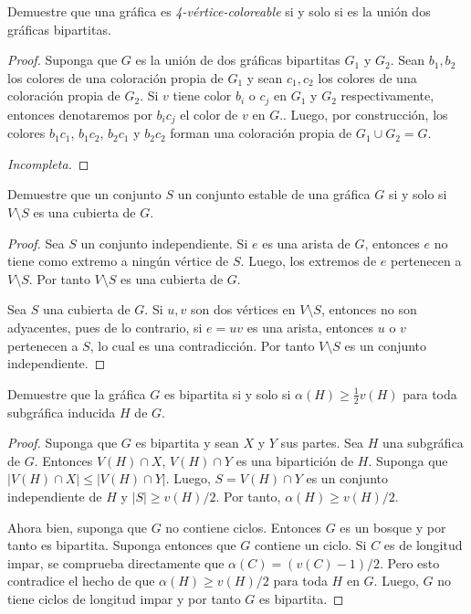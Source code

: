 \documentclass[12pt]{article}
\newenvironment{problem}[2][Problema]{\begin{trivlist}
\item[\hskip \labelsep {\bfseries #1}\hskip \labelsep {\bfseries #2.}]}{\end{trivlist}}
\begin{document}
\begin{problem}{11.2.4} Demuestre que una gráfica es \textit{4-vértice-coloreable} si y solo si es la unión dos gráficas bipartitas.
\end{problem}
\begin{proof}
Suponga que $G$ es la unión de dos gráficas bipartitas $G_1$ y $G_2.$ Sean $b_1, b_2$ los colores de una coloración propia de $G_1$ y sean $c_1, c_2$ los colores de una coloración propia de $G_2.$  Si $v$ tiene color $b_i$ o $c_j$ en $G_1$ y $G_2$ respectivamente, entonces denotaremos por $b_i c_j$ el color de $v$ en $G.$. Luego, por construcción, los colores $b_1 c_1$, $b_1 c_2$, $b_2 c_1$ y $b_2 c_2$ forman una coloración propia de $G_1 \cup G_2 = G.$

\textit{Incompleta.}
\end{proof}




\begin{problem}{12.1.2} Demuestre que un conjunto $S$ un conjunto estable de una gráfica $G$ si y solo si $V \setminus S$ es una cubierta de $G.$
\end{problem}
\begin{proof}
Sea $S$ un conjunto independiente. Si $e$ es una arista de $G$, entonces $e$ no tiene como extremo a ningún vértice de $S$. Luego, los extremos de $e$ pertenecen a $V \setminus S$. Por tanto $V\setminus S$ es una cubierta de $G.$

Sea $S$ una cubierta de $G$. Si $u, v$ son dos vértices en $V \setminus S$, entonces no son adyacentes, pues de lo contrario, si $e = uv$ es una arista, entonces  $u$ o $v$ pertenecen a $S$, lo cual es una contradicción. Por tanto $V \setminus S$ es un conjunto independiente.
\end{proof}


\begin{problem}{12.1.3} Demuestre que la gráfica $G$ es bipartita si y solo si $\alpha(H) \geq \frac{1}{2} v(H)$ para toda subgráfica inducida $H$ de $G.$
\end{problem}
\begin{proof}
Suponga que $G$ es bipartita y sean $X$ y $Y$ sus partes. Sea $H$ una subgráfica de $G$. Entonces $V(H) \cap X $, $V(H) \cap Y$ es una bipartición de $H$. Suponga que $\lvert V(H) \cap X \rvert \leq \lvert V(H) \cap Y \rvert$. Luego, $S = V(H) \cap Y$ es un conjunto independiente de $H$ y $\lvert S \rvert \geq v(H)/2$. Por tanto, $\alpha(H) \geq v(H)/2.$

Ahora bien, suponga que $G$ no contiene ciclos. Entonces $G$ es un bosque y por tanto es bipartita. Suponga entonces que $G$ contiene un ciclo.  Si $C$ es de longitud impar, se comprueba directamente que $\alpha(C) = (v(C) - 1)/2$. Pero esto contradice el hecho de que $\alpha(H) \geq v(H) / 2$ para toda $H$ en $G.$ Luego, $G$ no tiene ciclos de longitud impar y por tanto $G$ es bipartita.
\end{proof}
\end{document}
